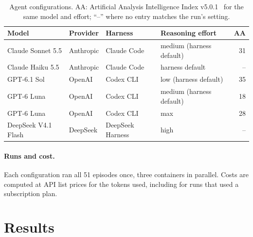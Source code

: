 \documentclass[11pt]{article}
\begin{document}
\begin{table}[!htbp]
\centering\small
\caption{Agent configurations. AA: Artificial Analysis Intelligence Index v5.0.1~\cite{aa2026index}
for the same model and effort; ``--'' where no entry matches the run's setting.}
\label{tab:agents}
\begin{tabular}{llllr}
\toprule
Model & Provider & Harness & Reasoning effort & AA \\
\midrule
Claude Sonnet 5.5 & Anthropic & Claude Code & medium (harness default) & 31 \\
Claude Haiku 5.5 & Anthropic & Claude Code & harness default & -- \\
GPT-6.1 Sol & OpenAI & Codex CLI & low (harness default) & 35 \\
GPT-6 Luna & OpenAI & Codex CLI & medium (harness default) & 18 \\
GPT-6 Luna & OpenAI & Codex CLI & max & 28 \\
DeepSeek V4.1 Flash & DeepSeek & DeepSeek Harness & high & -- \\
\bottomrule
\end{tabular}
\end{table}

\paragraph{Runs and cost.} Each configuration ran all 51 episodes once, three containers in
parallel. Costs are computed at API list prices for the tokens used, including for runs that used a
subscription plan.

\section{Results}\label{sec:results}
\end{document}
